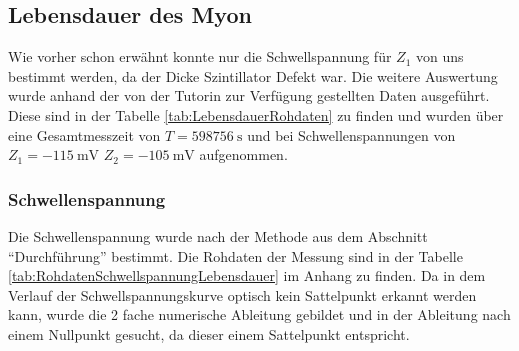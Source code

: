 \documentclass{article}
\begin{document}
\subsection{Lebensdauer des Myon}
Wie vorher schon erwähnt konnte nur die Schwellspannung für $Z_1$ von uns bestimmt werden, da der Dicke Szintillator Defekt war.
Die weitere Auswertung wurde anhand der von der Tutorin zur Verfügung gestellten Daten ausgeführt.
Diese sind in der Tabelle \ref{tab:LebensdauerRohdaten} zu finden und wurden über eine Gesamtmesszeit von $T=\SI{598756}{\second}$
und bei Schwellenspannungen von $Z_1=\SI{-115}{\milli\volt}$ $Z_2=\SI{-105}{\milli\volt}$ aufgenommen.

\subsubsection*{Schwellenspannung}
Die Schwellenspannung wurde nach der Methode aus dem Abschnitt \enquote{Durchführung} bestimmt. 
Die Rohdaten der Messung sind in der Tabelle \ref{tab:RohdatenSchwellspannungLebensdauer} im Anhang zu finden.
Da in dem Verlauf der Schwellspannungskurve optisch kein Sattelpunkt erkannt werden kann,  
wurde die 2 fache numerische Ableitung gebildet und in der Ableitung nach einem Nullpunkt gesucht, da dieser einem
Sattelpunkt entspricht.
\end{document}
